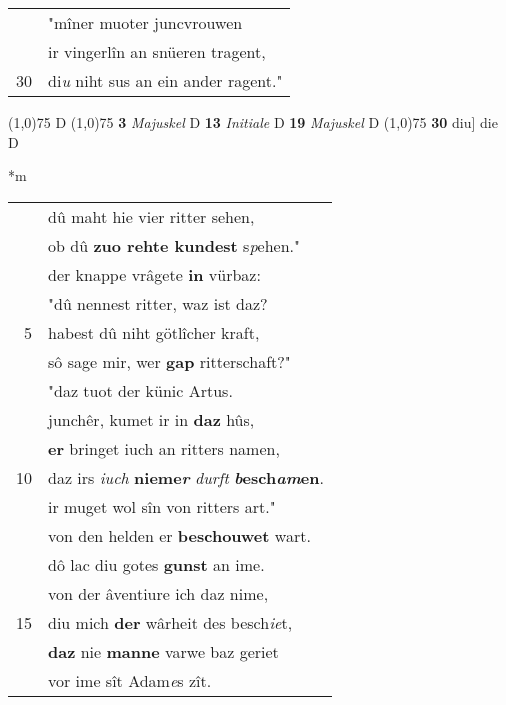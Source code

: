 \documentclass[8pt,a4paper,notitlepage]{article}
\begin{document}
\begin{table}[ht]
\begin{minipage}[t]{0.5\linewidth}
\begin{tabular}{rl}
 & "mîner muoter juncvrouwen\\ 
 & ir vingerlîn an snüeren tragent,\\ 
30 & di\textit{u} niht sus an ein ander ragent."\\ 
\end{tabular}
\scriptsize
\line(1,0){75} \newline
D \newline
\line(1,0){75} \newline
\textbf{3} \textit{Majuskel} D  \textbf{13} \textit{Initiale} D  \textbf{19} \textit{Majuskel} D  \newline
\line(1,0){75} \newline
\textbf{30} diu] die D \newline
\end{minipage}
\hspace{0.5cm}
\begin{minipage}[t]{0.5\linewidth}
\small
\begin{center}*m
\end{center}
\begin{tabular}{rl}
 & dû maht hie vier ritter sehen,\\ 
 & ob dû \textbf{zuo rehte kundest} s\textit{p}ehen."\\ 
 & der knappe vrâgete \textbf{in} vürbaz:\\ 
 & "dû nennest ritter, waz ist daz?\\ 
5 & habest dû niht götlîcher kraft,\\ 
 & sô sage mir, wer \textbf{gap} ritterschaft?"\\ 
 & "daz tuot der künic Artus.\\ 
 & junchêr, kumet ir in \textbf{daz} hûs,\\ 
 & \textbf{er} bringet iuch an ritters namen,\\ 
10 & daz irs \textit{iuch} \textbf{nieme\textit{r}} \textit{durft} \textbf{\textit{b}esch\textit{am}en}.\\ 
 & ir muget wol sîn von ritters art."\\ 
 & von den helden er \textbf{beschouwet} wart.\\ 
 & dô lac diu gotes \textbf{gunst} an ime.\\ 
 & von der âventiure ich daz nime,\\ 
15 & diu mich \textbf{der} wârheit des besch\textit{ie}t,\\ 
 & \textbf{daz} nie \textbf{manne} varwe baz geriet\\ 
 & vor ime sît Adam\textit{e}s zît.\\ 

\end{tabular}
\end{minipage}
\end{table}
\end{document}
